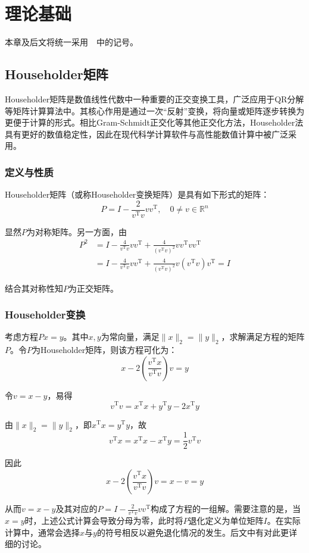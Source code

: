 ﻿\documentclass[UTF8,a4paper,openany]{ctexbook}
\theoremstyle{qrplain}
\begin{document}
\chapter{理论基础}

本章及后文将统一采用~\cite{higham2002}~中的记号。

\section{Householder矩阵}

Householder矩阵是数值线性代数中一种重要的正交变换工具，广泛应用于QR分解等矩阵计算算法中。其核心作用是通过一次“反射”变换，将向量或矩阵逐步转换为更便于计算的形式。相比Gram-Schmidt正交化等其他正交化方法，Householder法具有更好的数值稳定性，因此在现代科学计算软件与高性能数值计算中被广泛采用。

\subsection{定义与性质}

Householder矩阵（或称Householder变换矩阵）是具有如下形式的矩阵：
$$P=I-\frac{2}{v^\mathrm{T}v}vv^\mathrm{T},\quad 0\neq v \in \mathbb{R}^n$$

显然$P$为对称矩阵。另一方面，由
\begin{align*}
P^2&=I-\frac{4}{v^\mathrm{T}v}vv^\mathrm{T}+\frac{4}{(v^\mathrm{T}v)^2}vv^\mathrm{T}vv^\mathrm{T}\\&=I-\frac{4}{v^\mathrm{T}v}vv^\mathrm{T}+\frac{4}{(v^\mathrm{T}v)^2}v(v^\mathrm{T}v)v^\mathrm{T}=I
\end{align*}

结合其对称性知$P$为正交矩阵。

\subsection{Householder变换}

考虑方程$Px=y$。其中$x,y$为常向量，满足$\|x\|_2=\|y\|_2$，求解满足方程的矩阵$P$。令$P$为Householder矩阵，则该方程可化为：$$x-2(\frac{v^\mathrm{T}x}{v^\mathrm{T}v})v=y$$

令$v=x-y$，易得$$v^\mathrm{T}v=x^\mathrm{T}x+y^\mathrm{T}y-2x^\mathrm{T}y$$

由$\|x\|_2=\|y\|_2$，即$x^\mathrm{T}x=y^\mathrm{T}y$，故$$v^\mathrm{T}x=x^\mathrm{T}x-x^\mathrm{T}y=\frac{1}{2}v^\mathrm{T}v$$

因此$$x-2(\frac{v^\mathrm{T}x}{v^\mathrm{T}v})v=x-v=y$$

从而$v=x-y$及其对应的$P=I-\frac{2}{v^\mathrm{T}v}vv^\mathrm{T}$构成了方程的一组解。需要注意的是，当$x=y$时，上述公式计算会导致分母为零，此时将$P$退化定义为单位矩阵$I$。在实际计算中，通常会选择$x$与$y$的符号相反以避免退化情况的发生。后文中有对此更详细的讨论。
\end{document}
